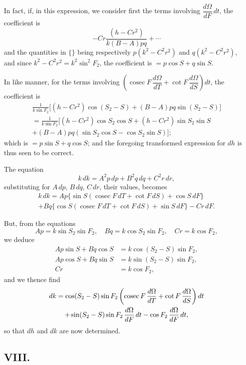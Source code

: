 \documentclass[11pt,a4paper]{article}
\DeclareMathOperator{\cosec}{cosec}
\begin{document}
In fact, if, in this expression, we consider first the terms involving $\dfrac{d\Omega}{dF}\,dt$, the coefficient is
\[
-Cr\frac{(h-Cr^2)}{k(B-A)pq} + \cdots
\]
and the quantities in $\{\}$ being respectively $p(k^2-C^2r^2)$ and $q(k^2-C^2r^2)$, and since $k^2 - C^2r^2 = k^2\sin^2 F_2$, the coefficient is $= p\cos S + q\sin S$.

In like manner, for the terms involving $\left(\cosec F\,\dfrac{d\Omega}{dT} + \cot F\,\dfrac{d\Omega}{dS}\right)dt$, the coefficient is
\begin{multline*}
\frac{1}{k\sin F_2}\bigl[(h-Cr^2)\cos(S_2-S) + (B-A)pq\sin(S_2-S)\bigr] \\
= \frac{1}{k\sin F_2}\bigl[(h-Cr^2)\cos S_2\cos S + (h-Cr^2)\sin S_2\sin S \\
+ (B-A)pq(\sin S_2\cos S - \cos S_2\sin S)\bigr];
\end{multline*}
which is $= p\sin S + q\cos S$; and the foregoing transformed expression for $dh$ is thus seen to be correct.

The equation
\[
k\,dk = A^2p\,dp + B^2q\,dq + C^2r\,dr,
\]
substituting for $A\,dp$, $B\,dq$, $C\,dr$, their values, becomes
\begin{multline*}
k\,dk = Ap\bigl\{\sin S(\cosec F\,dT + \cot F\,dS) + \cos S\,dF\bigr\} \\
+ Bq\bigl\{\cos S(\cosec F\,dT + \cot F\,dS) + \sin S\,dF\bigr\} - Cr\,dF.
\end{multline*}

But, from the equations
\[
Ap = k\sin S_2\sin F_2, \quad Bq = k\cos S_2\sin F_2, \quad Cr = k\cos F_2,
\]
we deduce
\begin{align*}
Ap\sin S + Bq\cos S &= k\cos(S_2-S)\sin F_2, \\
Ap\cos S + Bq\sin S &= k\sin(S_2-S)\sin F_2, \\
Cr &= k\cos F_2,
\end{align*}
and we thence find
\begin{multline}
dk = \cos(S_2-S)\sin F_2\left(\cosec F\,\frac{d\Omega}{dT} + \cot F\,\frac{d\Omega}{dS}\right)dt \notag\\
+ \sin(S_2-S)\sin F_2\,\frac{d\Omega}{dF}\,dt - \cos F_2\,\frac{d\Omega}{dF}\,dt,
\end{multline}
so that $dh$ and $dk$ are now determined.

\subsection*{VIII.}
\end{document}
